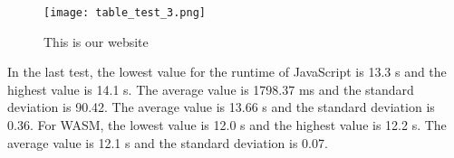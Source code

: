 \begin{figure}[H]
    \centering
    \caption[]{This is our website}
	\label{fig:tableTest3}
    \texttt{[image: table\_test\_3.png]}
\end{figure}
In the last test, the lowest value for the runtime of JavaScript is 13.3 s and the highest value is 14.1 s. The average value is 1798.37 ms and the standard deviation is 90.42. The average value is 13.66 s and the standard deviation is 0.36. For WASM, the lowest value is 12.0 s and the highest value is 12.2 s. The average value is 12.1 s and the standard deviation is 0.07.